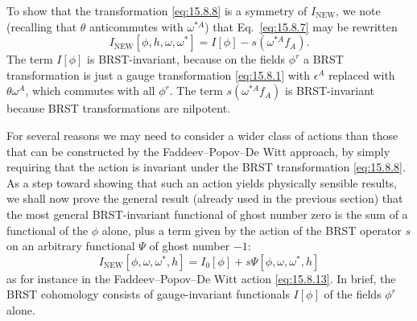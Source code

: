 To show that the transformation \eqref{eq:15.8.8} is a symmetry of $I_{\mathrm{NEW}}$, we note (recalling that $\theta$ anticommutes with $\omega^{*A}$) that Eq.~\eqref{eq:15.8.7} may be rewritten
\begin{equation}
 I_{\mathrm{NEW}}[\phi,h,\omega,\omega^*]=I[\phi]-s(\omega^{*A}f_A).
 \tag{15.8.13}\label{eq:15.8.13}
\end{equation}
The term $I[\phi]$ is BRST-invariant, because on the fields $\phi^r$ a BRST transformation is just a gauge transformation \eqref{eq:15.8.1} with $\epsilon^A$ replaced with $\theta\omega^A$, which commutes with all $\phi^r$. The term $s(\omega^{*A}f_A)$ is BRST-invariant because BRST transformations are nilpotent.

For several reasons we may need to consider a wider class of actions than those that can be constructed by the Faddeev--Popov--De Witt approach, by simply requiring that the action is invariant under the BRST transformation \eqref{eq:15.8.8}. As a step toward showing that such an action yields physically sensible results, we shall now prove the general result (already used in the previous section) that the most general BRST-invariant functional of ghost number zero is the sum of a functional of the $\phi$ alone, plus a term given by the action of the BRST operator $s$ on an arbitrary functional $\Psi$ of ghost number $-1$:
\begin{equation}
 I_{\mathrm{NEW}}[\phi,\omega,\omega^*,h]
 =I_0[\phi]+s\Psi[\phi,\omega,\omega^*,h]
 \tag{15.8.14}\label{eq:15.8.14}
\end{equation}
as for instance in the Faddeev--Popov--De Witt action \eqref{eq:15.8.13}. In brief, the BRST cohomology consists of gauge-invariant functionals $I[\phi]$ of the fields $\phi^r$ alone.

